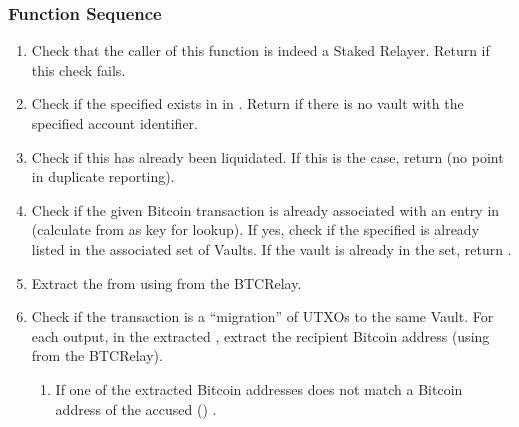 \documentclass[a4paper,10pt,english]{sphinxmanual}
\begin{document}
\subsubsection{Function Sequence}
\label{\detokenize{spec/staked-relayers:id12}}\begin{enumerate}
%
\item {} 
Check that the caller of this function is indeed a Staked Relayer. Return  if this check fails.

\item {} 
Check if the specified  exists in  in {\hyperref[\detokenize{spec/vault-registry:vault-registry}]{}}. Return  if there is no vault with the specified account identifier.

\item {} 
Check if this  has already been liquidated. If this is the case, return  (no point in duplicate reporting).

\item {} 
Check if the given Bitcoin transaction is already associated with an entry in  (calculate  from  as key for lookup). If yes, check if the specified  is already listed in the associated set of Vaults. If the vault is already in the set, return .

\item {} 
Extract the  from  using  from the BTC\sphinxhyphen{}Relay.

\item {} 
Check if the transaction is a “migration” of UTXOs to the same Vault. For each output, in the extracted , extract the recipient Bitcoin address (using  from the BTC\sphinxhyphen{}Relay).
\begin{enumerate}
%
\item {} 
If one of the extracted Bitcoin addresses does not match a Bitcoin address of the accused  () .


\end{enumerate}
\end{enumerate}
\end{document}
